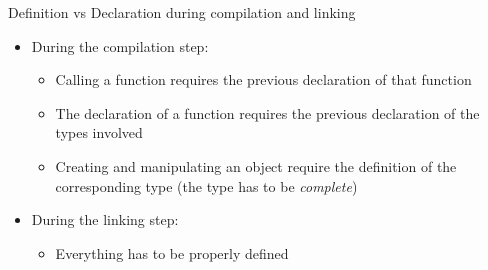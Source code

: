 \begin{frame}{Definition vs Declaration during compilation and linking}

  \begin{itemize}[<+->]
  \item During the compilation step:
  \begin{itemize}
  \item Calling a function requires the previous declaration of that function
  \item The declaration of a function requires the previous declaration of the
    types involved
  \item Creating and manipulating an object require the definition of the
    corresponding type (the type has to be \textit{complete})
  \end{itemize}

\item During the linking step:

  \begin{itemize}
  \item Everything has to be properly defined
  \end{itemize}
    \end{itemize}

\end{frame}

